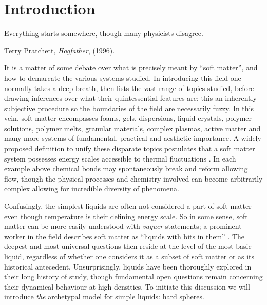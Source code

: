 \documentclass[11pt,twoside]{report}
\begin{document}
\chapter{Introduction}
\epigraph{Everything starts somewhere, though many physicists disagree.}{Terry Pratchett, \emph{Hogfather}, (1996).}

It is a matter of some debate over what is precisely meant by ``soft matter'', and how to demarcate the various systems studied.
In introducing this field one normally takes a deep breath, then lists the vast range of topics studied, before drawing inferences over what their quintessential features are; this an inherently subjective procedure so the boundaries of the field are necessarily fuzzy.
In this vein, soft matter encompasses foams, gels, dispersions, liquid crystals, polymer solutions, polymer melts, granular materials, complex plasmas, active matter and many more systems of fundamental, practical and aesthetic importance.
A widely proposed definition to unify these disparate topics postulates that a soft matter system possesses energy scales accessible to thermal fluctuations \cite{LubenskySSC1997}.
In each example above chemical bonds may spontaneously break and reform allowing flow, though the physical processes and chemistry involved can become arbitrarily complex allowing for incredible diversity of phenomena.

Confusingly, the simplest liquids%
are often not considered a part of soft matter even though temperature is their defining energy scale.
So in some sense, soft matter can be more easily understood with \emph{vaguer} statements; a prominent worker in the field describes soft matter as ``liquids with bits in them'' \cite{Poon2018}.
The deepest and most universal questions then reside at the level of the most basic liquid, regardless of whether one considers it as a subset of soft matter or as its historical antecedent.
Unsurprisingly, liquids have been thoroughly explored in their long history of study, though fundamental open questions remain concerning their dynamical behaviour at high densities.
To initiate this discussion we will introduce \emph{the} archetypal model for simple liquids: hard spheres.
\end{document}
